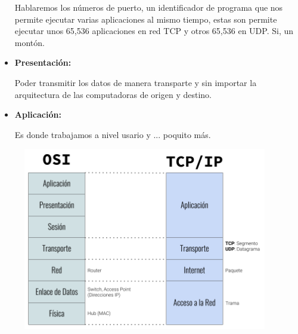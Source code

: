 \documentclass[12pt, fleqn]{report}                             %
\theoremstyle{break}                                            %
\begin{document}
\begin{itemize}
                    Hablaremos los números de puerto, un identificador de programa que nos permite ejecutar varias aplicaciones
                    al mismo tiempo, estas son permite ejecutar unos 65,536 aplicaciones en red TCP y otros 65,536 en UDP.
                    Si, un montón.

                \item \textbf{Presentación:}

                    Poder transmitir los datos de manera transparte y sin importar la arquitectura de las computadoras
                    de origen y destino.

                \item \textbf{Aplicación:}

                    Es donde trabajamos a nivel usario y ... poquito más.



            \end{itemize}



            \clearpage


            \begin{figure}[h]
                \centering
                \includegraphics[width=0.95\textwidth]{OSI&IP}
            \end{figure}




\end{document}
